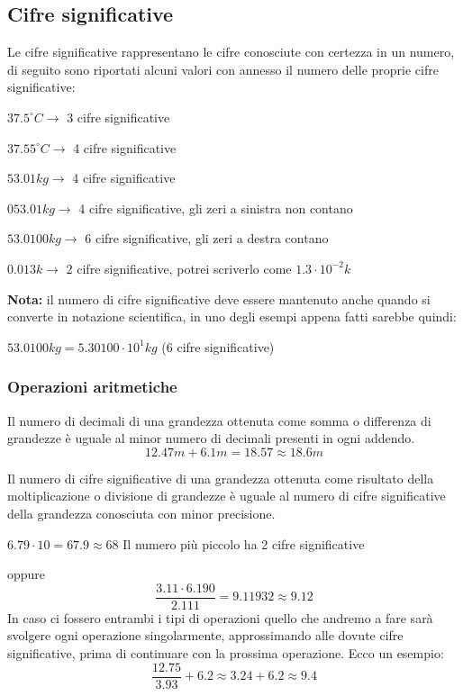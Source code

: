 \documentclass[../main.tex]{subfiles}
\begin{document}
\subsection{Cifre significative}
Le cifre significative rappresentano le cifre conosciute con certezza in un numero, di seguito sono riportati alcuni valori con annesso il numero delle proprie cifre significative:
\begin{center}
    $37.5^\circ C \rightarrow$ 3 cifre significative
\end{center}
\begin{center}
    $37.55^\circ C \rightarrow$ 4 cifre significative
\end{center}
\begin{center}
    $53.01kg \rightarrow$ 4 cifre significative
\end{center}
\begin{center}
    $053.01kg \rightarrow$ 4 cifre significative, gli zeri a sinistra non contano
\end{center}
\begin{center}
    $53.0100kg \rightarrow$ 6 cifre significative, gli zeri a destra contano
\end{center}
\begin{center}
    $0.013k \rightarrow$ 2 cifre significative, potrei scriverlo come $1.3\cdot10^{-2}k$
\end{center}
\textbf{Nota: }il numero di cifre significative deve essere mantenuto anche quando si converte in notazione scientifica, in uno degli esempi appena fatti sarebbe quindi:
\begin{center}
    $53.0100kg=5.30100\cdot10^1kg$ (6 cifre significative)
\end{center}

\subsubsection{Operazioni aritmetiche}
Il numero di decimali di una grandezza ottenuta come somma o differenza di grandezze è uguale al minor numero di decimali presenti in ogni addendo.
$$
    12.47m+6.1m=18.57\approx18.6m
$$

Il numero di cifre significative di una grandezza ottenuta come risultato della moltiplicazione o divisione di grandezze è uguale al numero di cifre significative della grandezza conosciuta con minor precisione.
\begin{center}
    $6.79\cdot10=67.9\approx68$ Il numero più piccolo ha 2 cifre significative
\end{center}
oppure
$$
    \frac{3.11\cdot6.190}{2.111}=9.11932\approx9.12
$$
In caso ci fossero entrambi i tipi di operazioni quello che andremo a fare sarà svolgere ogni operazione singolarmente, approssimando alle dovute cifre significative, prima di continuare con la prossima operazione. Ecco un esempio:
$$
    \frac{12.75}{3.93}+6.2\approx3.24+6.2\approx9.4
$$
\end{document}
